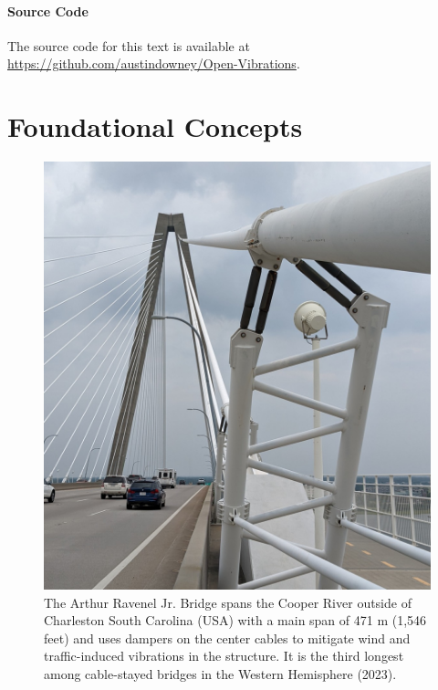\documentclass[12pt,letter]{article}
\begin{document}
\subsection{Source Code}
The source code for this text is available at \url{https://github.com/austindowney/Open-Vibrations}.








\setcounter{secnumdepth}{3} %
\setcounter{page}{1}


\part{Foundational Concepts}

\begin{figure}[H]
	\centering
	\includegraphics[width=6.5in]{figures/Arthur_Ravenel_Jr_Bridge_dampers} \\
	The Arthur Ravenel Jr. Bridge spans the Cooper River outside of Charleston South Carolina (USA) with a main span of 471 m (1,546 feet) and uses dampers on the center cables to mitigate wind and traffic-induced vibrations in the structure. It is the third longest among cable-stayed bridges in the Western Hemisphere (2023).
\end{figure}
\end{document}
